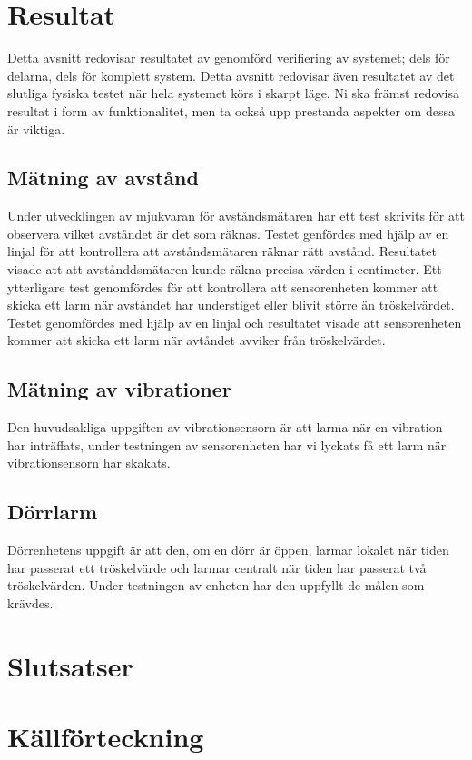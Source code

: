 \documentclass{article}
\begin{document}
\section{Resultat}
Detta avsnitt redovisar resultatet av genomförd verifiering av systemet; dels för delarna, dels för komplett system. 
Detta avsnitt redovisar även resultatet av det slutliga fysiska testet när hela systemet körs i skarpt läge. 
Ni ska främst redovisa resultat i form av funktionalitet, men ta också upp prestanda aspekter om dessa är viktiga.

\subsection{Mätning av avstånd}

Under utvecklingen av mjukvaran för avståndsmätaren har ett test skrivits för att observera vilket avståndet är det som räknas. Testet genfördes med hjälp av en linjal för att kontrollera att avståndsmätaren räknar rätt avstånd. Resultatet visade att att avstånddsmätaren kunde räkna precisa värden i centimeter. Ett ytterligare test genomfördes för att kontrollera att sensorenheten kommer att skicka ett larm när avståndet har understiget eller blivit större än tröskelvärdet. Testet genomfördes med hjälp av en linjal och resultatet visade att sensorenheten kommer att skicka ett larm när avtåndet avviker från tröskelvärdet. 

\subsection{Mätning av vibrationer}
Den huvudsakliga uppgiften av vibrationsensorn är att larma när en vibration har inträffats, under testningen av sensorenheten har vi lyckats få ett larm när vibrationsensorn har skakats.


\subsection{Dörrlarm}
Dörrenhetens uppgift är att den, om en dörr är öppen, larmar lokalet när tiden har passerat ett tröskelvärde och larmar centralt när tiden har passerat två tröskelvärden. Under testningen av enheten har den uppfyllt de målen som krävdes.


\section{Slutsatser}


\newpage
\section{Källförteckning}
\printbibliography[heading=none]
\end{document}
